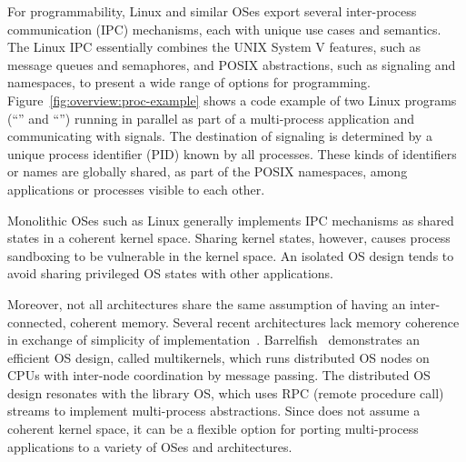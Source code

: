 For programmability, Linux and similar OSes export several inter-process communication (IPC) mechanisms,
each with unique use cases and semantics.
The Linux IPC essentially combines the UNIX System V features, such as message queues and semaphores,
and POSIX abstractions, such as signaling and namespaces,
to present a wide range of options for programming.
Figure~\ref{fig:overview:proc-example} shows a code example of
two Linux programs (``'' and ``'')
running in parallel as part of a multi-process application and communicating with signals.
The destination of signaling is determined by a unique process identifier (PID)
known by all processes.
These kinds of identifiers or names are globally shared, as part of the POSIX namespaces,
among applications or processes visible to each other.




Monolithic OSes such as Linux generally implements IPC mechanisms as shared states in a coherent kernel space.
Sharing kernel states, however, causes process sandboxing
to be vulnerable in the kernel space.
An isolated OS design tends to avoid sharing privileged OS states with other applications.


Moreover, not all architectures share the same assumption of having an inter-connected, coherent memory.
Several recent architectures lack memory coherence
in exchange of simplicity of implementation~\cite{gschwind2007,cascaval2002evaluation}.
Barrelfish~\cite{baumann09barrelfish} demonstrates an efficient OS design, called multikernels, which runs distributed OS nodes on CPUs with inter-node coordination by message passing.
The distributed OS design resonates with the \graphene{} library OS, which uses RPC (remote procedure call) streams to implement multi-process abstractions.
Since \graphene{} does not assume a coherent kernel space, it can be a flexible option
for porting multi-process applications to a variety of OSes and architectures.



